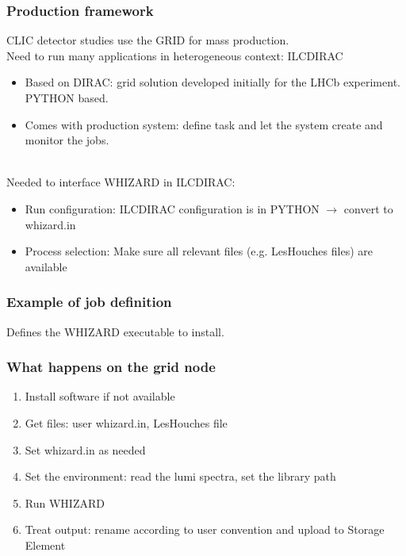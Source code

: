 \documentclass{beamer}
\newcommand{\whizard}{WHIZARD\xspace}
\begin{document}
\begin{frame}
\frametitle{Production framework}
CLIC detector studies use the {\color{blue} GRID} for mass production.\\
Need to  run many applications in heterogeneous context: \alert{ILCDIRAC}
\begin{itemize}
  \item Based on DIRAC: grid solution developed initially for the LHCb
  experiment. {\color{blue}PYTHON} based.
  \item Comes with production system: define task and let the system create
  and monitor the jobs.
\end{itemize}
~\\
Needed to interface \whizard in ILCDIRAC:
\begin{itemize}
  \item Run configuration: ILCDIRAC configuration is in PYTHON $\to$ convert to
  whizard.in
  \item Process selection: Make sure all relevant files (e.g. LesHouches files)
  are available
\end{itemize}
\end{frame}
\begin{frame}
\frametitle{Example of job definition}

Defines the \whizard executable to install.
\end{frame}
\begin{frame}
\frametitle{What happens on the grid node}
\begin{enumerate}
  \item Install software if not available
  \item Get files: user whizard.in, LesHouches file
  \item Set whizard.in as needed
  \item Set the environment: read the lumi spectra, set the library path
  \item Run \whizard
  \item Treat output: rename according to user convention and upload to Storage
  Element
\end{enumerate}
\end{frame}
\end{document}
